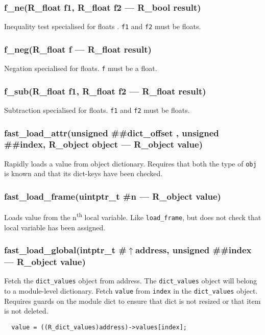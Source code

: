 \subsubsection{f\_ne(R\_float f1, R\_float f2 --- R\_bool result)}
\vspace{-1em}Inequality test specialised for floats . \texttt{f1} and \texttt{f2} must be floats. \vspace{-1em}
\subsubsection{f\_neg(R\_float f --- R\_float result)}
\vspace{-1em}Negation specialised for floats. \texttt{f} must be a float. \vspace{-1em}
\subsubsection{f\_sub(R\_float f1, R\_float f2 --- R\_float result)}
\vspace{-1em}Subtraction specialised for floats. \texttt{f1} and \texttt{f2} must be floats. \vspace{-1em}
\subsubsection{fast\_load\_attr(unsigned \#\#dict\_offset , unsigned \#\#index, R\_object object --- R\_object value)}
\vspace{-1em}Rapidly loads a value from object dictionary. Requires that both the type of \texttt{obj} is known and that its dict-keys have been checked. \vspace{-1em}
\subsubsection{fast\_load\_frame(uintptr\_t \#n --- R\_object value)}
\vspace{-1em}Loads value from the n\textsuperscript{th} local variable. Like \texttt{load\_frame}, but does not check that local variable has been assigned. \vspace{-1em}
\subsubsection{fast\_load\_global(intptr\_t \#$\uparrow$address, unsigned \#\#index --- R\_object value)}
\vspace{-1em}Fetch the \texttt{dict\_values} object from address. The  \texttt{dict\_values} object will belong to a module-level dictionary. Fetch \texttt{value} from \texttt{index} in the \texttt{dict\_values} object. Requires guards on the module dict to ensure that dict is not resized  or that item is not deleted. \vspace{-1em}\begin{verbatim}
  value = ((R_dict_values)address)->values[index];
\end{verbatim}
\vspace{-1em}\vspace{-1em}
